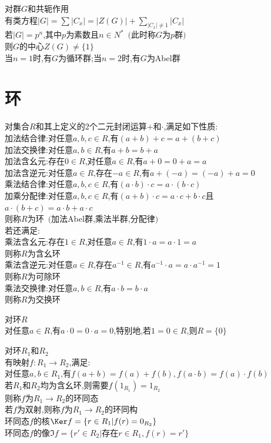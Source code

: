 \begin{tuilun}
对群$G$和共轭作用\\
有类方程$|G|=\sum|C_x|=|Z(G)|+\sum\limits_{|C_{x}|\neq 1}|C_x|$\\
若$|G|=p^n$,其中$p$为素数且$n\in N^*$\ $($此时称$G$为$p$群$)$\\
则$G$的中心$Z(G)\neq\{1\}$\\
当$n=1$时,有$G$为循环群;当$n=2$时,有$G$为Abel群
\end{tuilun}

\chapter{环}

\begin{dingyi}
对集合$R$和其上定义的$2$个二元封闭运算$+$和$\cdot$,满足如下性质:\\
加法结合律:对任意$a,b,c\in R$,有$(a+b)+c=a+(b+c)$\\
加法交换律:对任意$a,b\in R$,有$a+b=b+a$\\
加法含幺元:存在$0\in R$,对任意$a\in R$,有$a+0=0+a=a$\\
加法含逆元:对任意$a\in R$,存在$-a\in R$,有$a+(-a)=(-a)+a=0$\\
乘法结合律:对任意$a,b,c\in R$,有$(a\cdot b)\cdot c=a\cdot (b\cdot c)$\\
加乘分配律:对任意$a,b,c\in R$,有$(a+b)\cdot c=a\cdot c+b\cdot c$且$a\cdot (b+c)=a\cdot b+a\cdot c$\\
则称$R$为环\ $($加法Abel群,乘法半群,分配律$)$\\
若还满足:\\
乘法含幺元:存在$1\in R$,对任意$a\in R$,有$1\cdot a=a\cdot 1=a$\\
则称$R$为含幺环\\
乘法含逆元:对任意$a\in R$,存在$a^{-1}\in R$,有$a^{-1}\cdot a=a\cdot a^{-1}=1$\\
则称$R$为可除环\\
乘法交换律:对任意$a,b\in R$,有$a\cdot b=b\cdot a$\\
则称$R$为交换环
\end{dingyi}

\begin{dingli}
对环$R$\\
对任意$a\in R$,有$a\cdot 0=0\cdot a=0$,特别地,若$1=0\in R$,则$R=\{0\}$
\end{dingli}

\begin{dingyi}
对环$R_1$和$R_2$\\
有映射$f:R_1\to R_2$,满足:\\
对任意$a,b\in R_1$,有$f(a+b)=f(a)+f(b),f(a\cdot b)=f(a)\cdot f(b)$\\
若$R_1$和$R_2$均为含幺环,则需要$f(1_{R_1})=1_{R_2}$\\
则称$f$为$R_1\to R_2$的环同态\\
若$f$为双射,则称$f$为$R_1\to R_2$的环同构\\
环同态$f$的核$\Ker f=\{r\in R_1|f(r)=0_{R_2}\}$\\
环同态$f$的像$\Im f=\{r'\in R_2|\text{存在}r\in R_1,f(r)=r'\}$
\end{dingyi}

